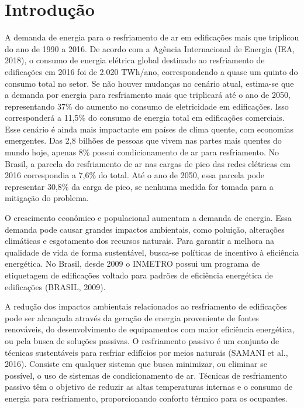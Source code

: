 \documentclass[brazil,hardcopy,openany,a5paper]{ufscthesis}
\begin{document}
	
	\frontmatter
	\folhaderosto[]%
	
	\mainmatter

	\chapter{Introdução}
	\label{chapter:introducao}
	
	A demanda de energia para o resfriamento de ar em edificações mais que triplicou do ano de 1990 a 2016. De acordo com a Agência Internacional de Energia (IEA, 2018), o consumo de energia elétrica global destinado ao resfriamento de edificações em 2016 foi de 2.020 TWh/ano, correspondendo a quase um quinto do consumo total no setor. Se não houver mudanças no cenário atual, estima-se que a demanda por energia para resfriamento mais que triplicará até o ano de 2050, representando 37\% do aumento no consumo de eletricidade em edificações. Isso corresponderá a 11,5\% do consumo de energia total em edificações comerciais. Esse cenário é ainda mais impactante em países de clima quente, com economias emergentes. Das 2,8 bilhões de pessoas que vivem nas partes mais quentes do mundo hoje, apenas 8\% possui condicionamento de ar para resfriamento. No Brasil, a parcela do resfriamento de ar nas cargas de pico das redes elétricas em 2016 correspondia a 7,6\% do total. Até o ano de 2050, essa parcela pode representar 30,8\% da carga de pico, se nenhuma medida for tomada para a mitigação do problema.
	
	O crescimento econômico e populacional aumentam a demanda de energia. Essa demanda pode causar grandes impactos ambientais, como poluição, alterações climáticas e esgotamento dos recursos naturais. Para garantir a melhora na qualidade de vida de forma sustentável, busca-se políticas de incentivo à eficiência energética. No Brasil, desde 2009 o INMETRO possui um programa de etiquetagem de edificações voltado para padrões de eficiência energética de edificações (BRASIL, 2009).
	
	A redução dos impactos ambientais relacionados ao resfriamento de edificações pode ser alcançada através da geração de energia proveniente de fontes renováveis, do desenvolvimento de equipamentos com maior eficiência energética, ou pela busca de soluções passivas. O resfriamento passivo é um conjunto de técnicas sustentáveis para resfriar edifícios por meios naturais (SAMANI et al., 2016). Consiste em qualquer sistema que busca minimizar, ou eliminar se possível, o uso de sistemas de condicionamento de ar. Técnicas de resfriamento passivo têm o objetivo de reduzir as altas temperaturas internas e o consumo de energia para resfriamento, proporcionando conforto térmico para os ocupantes.
	
\end{document}
